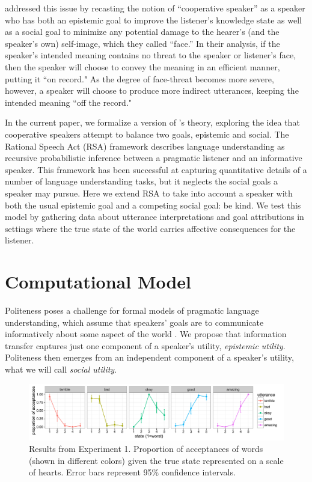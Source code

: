\documentclass[10pt,letterpaper]{article}
\begin{document}
 addressed this issue by recasting the notion of ``cooperative speaker'' as a speaker
who has both an epistemic goal to improve the listener's knowledge state as well as a social goal to minimize any potential damage to the hearer's (and the speaker's own) self-image, which they called ``face.''
In their analysis, if the speaker's intended meaning contains no threat to the speaker or listener's face,
then the speaker will choose to convey the meaning in an efficient manner, putting it ``on record."
As the degree of face-threat becomes more severe, however,
a speaker will choose to produce more indirect utterances, keeping the intended meaning ``off the record."

In the current paper, we formalize a version of 's theory, exploring the idea that cooperative speakers attempt to balance two goals, epistemic and social.
The Rational Speech Act (RSA) framework \cite{Frank2012, Goodman2013} describes language understanding as recursive probabilistic inference between a pragmatic listener and an informative speaker. This framework has been successful at capturing quantitative details of a number of language understanding tasks, but it neglects the social goals a speaker may pursue.
Here we extend RSA to take into account a speaker with both the usual epistemic goal and a competing social goal: be kind.
We test this model by gathering data about utterance interpretations and goal attributions in settings where the true state of the world carries affective consequences for the listener.


\section{Computational Model}

Politeness poses a challenge for formal models of pragmatic language understanding, which assume that speakers' goals are to communicate informatively about some aspect of the world \cite{Frank2012, Goodman2013}.
We propose that information transfer captures just one component of a speaker's utility, \emph{epistemic utility}.
Politeness then emerges from an independent component of a speaker's utility, what we will call \emph{social utility}.


\begin{figure}[!b]
\begin{center}
  \includegraphics[width=.9\textwidth]{figures/exp1.pdf}
  \caption{\label{fig:exp1} Results from Experiment 1. Proportion of acceptances of words (shown in different colors) given the true state represented on a scale of hearts. Error bars represent 95\% confidence intervals.}
  \end{center}
\end{figure}
\end{document}
